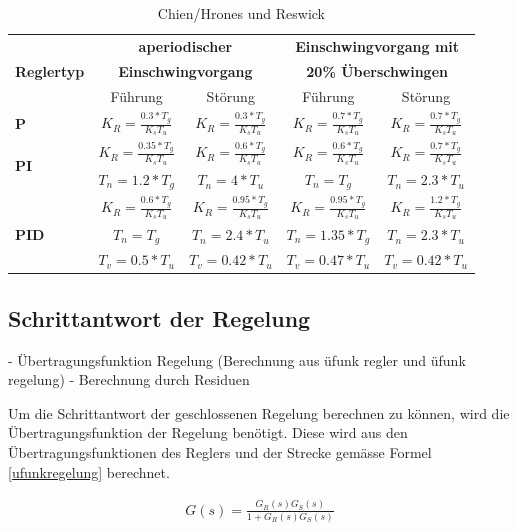 \begin{table}
\centering
\renewcommand*{\arraystretch}{1.5}
\begin{tabular}{|l|c|c|c|c|}
\hline 
& \multicolumn{2}{c|}{\textbf{aperiodischer}} & \multicolumn{2}{c|}{\textbf{Einschwingvorgang mit}} \\
\textbf{Reglertyp} & \multicolumn{2}{c|}{\textbf{Einschwingvorgang}} & \multicolumn{2}{c|}{\textbf{20\% Überschwingen}}\\
\cline{2-5} 
 & Führung & Störung & Führung & Störung \\ 
\hline 
\textbf{P} & $K_R=\frac{0.3*T_g}{K_sT_u}$ & $K_R=\frac{0.3*T_g}{K_sT_u}$ & $K_R=\frac{0.7*T_g}{K_sT_u}$ & $K_R=\frac{0.7*T_g}{K_sT_u}$ \\ 
\hline 
\multirow{2}{*}{\textbf{PI}} & $K_R=\frac{0.35*T_g}{K_sT_u}$ & $K_R=\frac{0.6*T_g}{K_sT_u}$ & $K_R=\frac{0.6*T_g}{K_sT_u}$ & $K_R=\frac{0.7*T_g}{K_sT_u}$ \\ 
& $T_n=1.2*T_g$ & $T_n=4*T_u$ & $T_n=T_g$ & $T_n=2.3*T_u$ \\ 
\hline 
 & $K_R=\frac{0.6*T_g}{K_sT_u}$ & $K_R=\frac{0.95*T_g}{K_sT_u}$ & $K_R=\frac{0.95*T_g}{K_sT_u}$ & $K_R=\frac{1.2*T_g}{K_sT_u}$\\ 
\textbf{PID} & $T_n=T_g$ & $T_n=2.4*T_u$ &  $T_n=1.35*T_g$ & $T_n=2.3*T_u$ \\ 
 & $T_v=0.5*T_u$ & $T_v=0.42*T_u$ & $T_v=0.47*T_u$ & $T_v=0.42*T_u$ \\ 
\hline 
\end{tabular}
\renewcommand*{\arraystretch}{1}
\caption{Chien/Hrones und Reswick} 
\end{table}


\newpage
\subsection{Schrittantwort der Regelung}
- Übertragungsfunktion Regelung (Berechnung aus üfunk regler und üfunk regelung)\newline
- Berechnung durch Residuen\newline

Um die Schrittantwort der geschlossenen Regelung berechnen zu können, wird die Übertragungsfunktion der Regelung benötigt. Diese wird aus den Übertragungsfunktionen des Reglers und der Strecke gemässe Formel \ref{ufunkregelung} berechnet.

\begin{align}
G(s)=\frac{G_R(s)G_S(s)}{1+G_R(s)G_S(s)}
\label{ufunkregelung}
\end{align}
